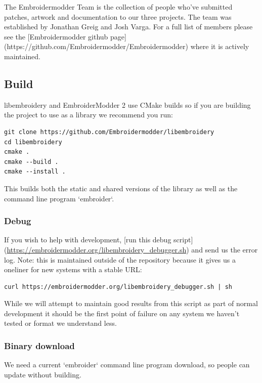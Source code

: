 \documentclass[a4paper, 11pt]{report}
\begin{document}
The Embroidermodder Team is the collection of people who've submitted
patches, artwork and documentation to our three projects.
The team was established by Jonathan Greig and Josh Varga.
For a full list of members please see the
[Embroidermodder github page](https://github.com/Embroidermodder/Embroidermodder)
where it is actively maintained.

\subsection{Build}

libembroidery and EmbroiderModder 2 use CMake builds
so if you are building the project to use as a library we recommend
you run:
 
\begin{verbatim}
git clone https://github.com/Embroidermodder/libembroidery
cd libembroidery
cmake .
cmake --build .
cmake --install .
\end{verbatim}

This builds both the static and shared versions of the library as well
as the command line program `embroider`.

\subsubsection{Debug}

If you wish to help with development, [run this debug script](\url{https://embroidermodder.org/libembroidery_debugger.sh}) and send us the error log. Note: this is maintained outside of the repository because it gives us a oneliner for new systems with a stable URL:

\begin{verbatim}
curl https://embroidermodder.org/libembroidery_debugger.sh | sh
\end{verbatim}

While we will attempt to maintain good results from this script as part of normal development it should be the first point of failure on any system we haven't tested or format we understand less.



\subsubsection{Binary download}

We need a current `embroider` command line program download, so people can update
without building.
\end{document}
